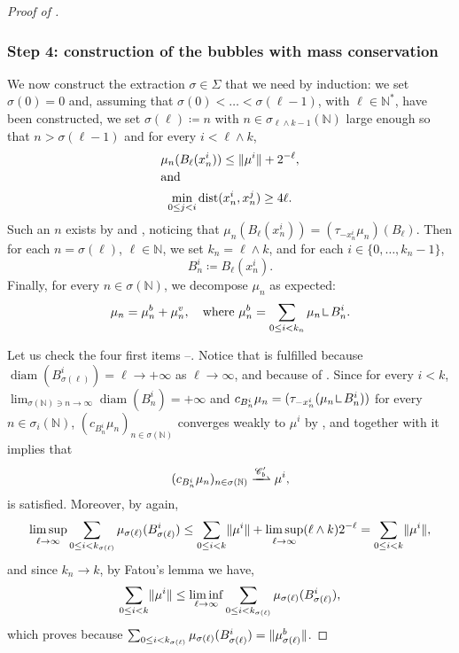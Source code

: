 \documentclass[JEP,XML,SOM,Unicode,published]{cedram}
\theoremstyle{plain}
\theoremstyle{definition}
\newcommand{\N}{\mathbb{N}}
\newcommand{\Cspace}{\mathscr{C}}
\newcommand{\mres}{\mathop{\hbox{\vrule height 6pt width .5pt depth 0pt \vrule height .5pt width 4pt depth 0pt}}\nolimits}
\DeclarePairedDelimiter{\norm}{\lVert}{\rVert}
\DeclareMathOperator{\diam}{diam}
\DeclareMathOperator{\dist}{dist}
\newcommand{\narrowto}{\xrightharpoonup{\Cspace_b'}}
\begin{document}
\begin{proof}[Proof of ]
\subsubsection*{Step 4: construction of the bubbles with mass conservation}
We now construct the extraction \(\sigma\in\Sigma\) that we need by induction: we set \(\sigma(0)=0\) and, assuming that \(\sigma(0)<\dots<\sigma(\ell-1)\), with \(\ell\in\N^\ast\), have been constructed, we set \(\sigma(\ell)\coloneqq n\) with \(n\in\sigma_{\ell \wedge k -1}(\N)\) large enough so that $n > \sigma(\ell-1)$ and for every \(i< \ell \wedge k\),\vspace*{-3pt}
\begin{gather}
\mu_n(B_\ell(x^i_n))\le\norm{\mu^i}+2^{-\ell},\label{inductionBubbles1}\\[-3pt]
\shortintertext{and}
\min_{0\le j<i}\dist(x^i_n,x^j_n)\ge 4\ell.\label{inductionBubbles2}
\end{gather}
Such an \(n\) exists by  and , noticing that $\mu_n(B_\ell(x_n^i)) = (\tau_{-x_n^i} \mu_n)(B_\ell)$. Then for each \(n=\sigma(\ell)\), \(\ell\in\N\), we set \(k_n=\ell \wedge k\), and for each \(i\in\{0,\dots,k_n-1\}\),\vspace*{-3pt}
\[
B^i_n\coloneqq B_\ell(x^i_n).
\]
Finally, for every \(n\in\sigma(\N)\), we decompose $\mu_n$ as expected:\vspace*{-3pt}
\[
\mu_n = \mu^b_n + \mu^v_n,\quad \text{where } \mu^b_n = \sum_{0\le i < k_n} \mu_n \mres B_n^i.
\]

Let us check the four first items --. Notice that  is fulfilled because $\diam(B_{\sigma(\ell)}^i) = \ell \to +\infty$ as $\ell\to\infty$, and  because of . Since for every $i<k$, $\lim_{\sigma(\N)\ni n \to\infty}\diam(B_n^i) = +\infty$ and $c_{B_n^i} \mu_n = (\tau_{-x_n^i} (\mu_n\mres B_n^i))$ for every $n \in \sigma_i(\N)$, $(c_{B_n^i} \mu_n)_{n\in\sigma(\N)}$ converges weakly to $\mu^i$ by , and together with  it implies that\vspace*{-3pt}
\[(c_{B_n^i} \mu_n)_{n\in\sigma(\N)} \narrowto \mu^i,\]
\ie {} is satisfied.
Moreover, by  again,\vspace*{-3pt}
\[
\limsup_{\ell\to\infty}\sum_{0\le i<k_{\sigma(\ell)}}\mu_{\sigma(\ell)}(B^i_{\sigma(\ell)})\le \sum_{0\le i<k}\norm{\mu^i}+\limsup_{\ell\to\infty}(\ell \wedge k) 2^{-\ell}=\sum_{0\le i<k}\norm{\mu^i},
\]
and since $k_n \to k$, by Fatou's lemma we have,\vspace*{-3pt}
\[\sum_{0\leq i < k}\norm{\mu^i} \leq \liminf_{\ell\to\infty}\sum_{0\le i<k_{\sigma(\ell)}}\mu_{\sigma(\ell)}(B^i_{\sigma(\ell)}),\]
which proves  because $ \sum_{0\le i<k_{\sigma(\ell)}}\mu_{\sigma(\ell)}(B^i_{\sigma(\ell)}) = \norm{\mu^b_{\sigma(\ell)}}$.


\end{proof}
\end{document}
